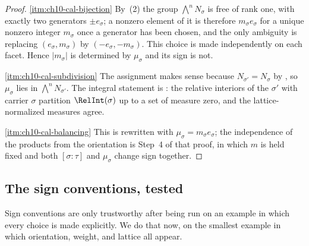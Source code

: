 \begin{proof}
\cref{itm:ch10-cal-bijection} By \,(2) the
group $\bigwedge^nN_\sigma$ is free of rank one, with exactly two
generators $\pm e_\sigma$; a nonzero element of it is therefore
$m_\sigma e_\sigma$ for a unique nonzero integer $m_\sigma$ once a
generator has been chosen, and the only ambiguity is replacing
$(e_\sigma,m_\sigma)$ by $(-e_\sigma,-m_\sigma)$.  This choice is made
independently on each facet.  Hence $|m_\sigma|$ is determined by
$\mu_\sigma$ and its sign is not.

\cref{itm:ch10-cal-subdivision} The assignment makes sense because
$N_{\sigma'}=N_\sigma$ by , so
$\mu_\sigma$ lies in $\bigwedge^nN_{\sigma'}$.  The integral statement is
: the relative interiors of the
$\sigma'$ with carrier $\sigma$ partition $\RelInt(\sigma)$ up to a set of
measure zero, and the lattice-normalized measures agree.

\cref{itm:ch10-cal-balancing} This is
 rewritten with
$\mu_\sigma=m_\sigma e_\sigma$; the independence of the products from the
orientation is Step~4 of that proof, in which $m$ is held fixed and both
$[\sigma:\tau]$ and $\mu_\sigma$ change sign together.
\end{proof}

\subsection{The sign conventions, tested}
\label{sec:ch10-sign-test}

Sign conventions are only trustworthy after being run on an example in which
every choice is made explicitly.  We do that now, on the smallest example in
which orientation, weight, and lattice all appear.

